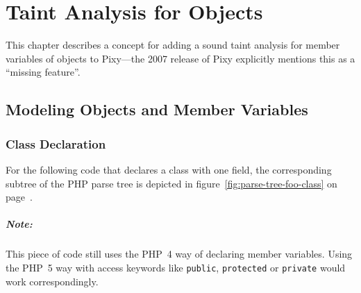 \chapter{Taint Analysis for Objects}
\label{field-tainting}

This chapter describes a concept for adding a sound taint analysis for member variables of objects to Pixy---the 2007 release of Pixy explicitly mentions this as a ``missing feature''.


\section{Modeling Objects and Member Variables}


\subsection{Class Declaration}

For the following code that declares a class with one field, the corresponding subtree of the PHP parse tree is depicted in figure~\ref{fig:parse-tree-foo-class} on page~\pageref{fig:parse-tree-foo-class}.


\paragraph{Note:} This piece of code still uses the PHP~4 way of declaring member variables. Using the PHP~5 way with access keywords like \texttt{public}, \texttt{protected} or \texttt{private} would work correspondingly.


